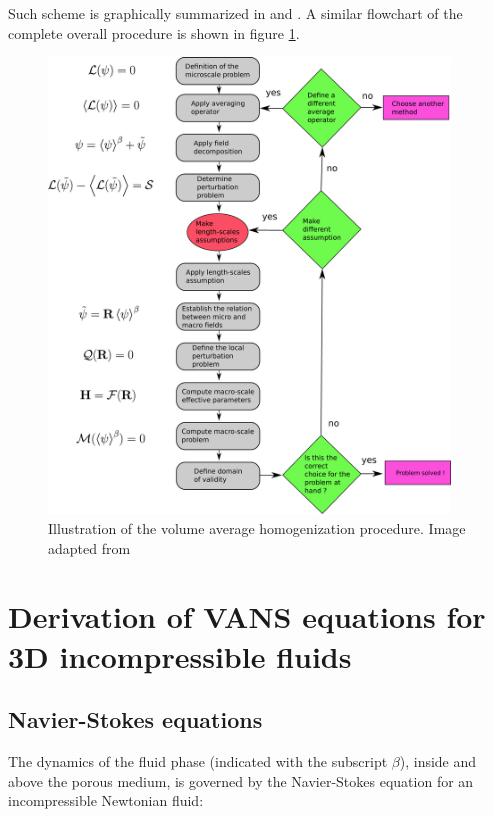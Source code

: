 Such scheme is graphically summarized in \citet{paez2017macroscopic} and \citet{davit2013homogenization}. A similar flowchart of the complete overall procedure is shown in figure \ref{fig:schema_vans_homo}.

\begin{figure}[h!]
	\centering
	\includegraphics[width=0.95\textwidth,height=0.95\textheight,keepaspectratio]{chapter_2/figure/schema}
	\caption{Illustration of the volume average homogenization procedure. Image adapted from \citet{davit2013homogenization}}
	\label{fig:schema_vans_homo}
\end{figure}

\section{Derivation of VANS equations for 3D incompressible fluids}
\subsection{Navier-Stokes equations}
The dynamics of the fluid phase (indicated with the subscript $\beta$), inside and above the porous medium, is governed by the Navier-Stokes equation for an incompressible Newtonian fluid:

